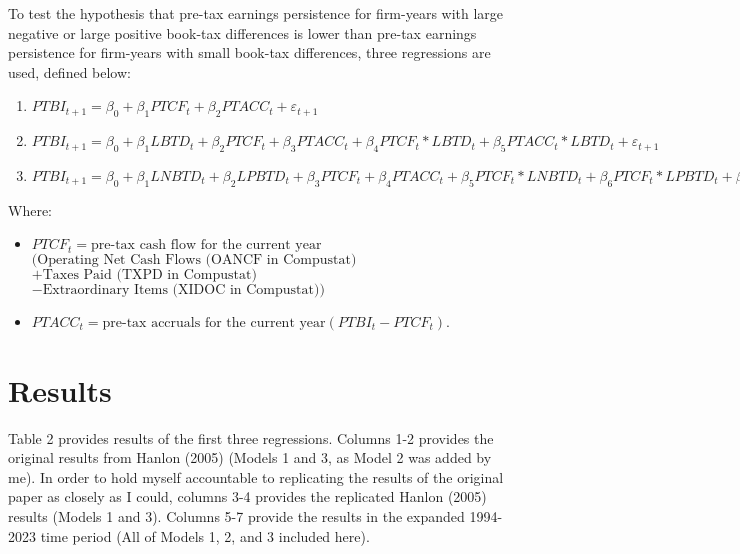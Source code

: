 \documentclass{article}
\begin{document}
To test the hypothesis that pre-tax earnings persistence for firm-years with large negative or large positive book-tax differences is lower than pre-tax earnings persistence for firm-years with small book-tax differences, three regressions are used, defined below:
\begin{enumerate}
    \item $PTBI_{t+1} = \beta_0 + \beta_1PTCF_t + \beta_2PTACC_t + \varepsilon_{t+1}$
    \item $PTBI_{t+1} = \beta_0 + \beta_1LBTD_t + \beta_2PTCF_t + \beta_3PTACC_t + \beta_4PTCF_t * LBTD_t + \beta_5PTACC_t * LBTD_t + \varepsilon_{t+1}$
    \item $PTBI_{t+1} = \beta_0 + \beta_1LNBTD_t + \beta_2LPBTD_t + \beta_3PTCF_t + \beta_4PTACC_t + \beta_5PTCF_t * LNBTD_t + \beta_6PTCF_t * LPBTD_t + \beta_7PTACC_t * LNBTD_t + \beta_8PTACC_t * LPBTD_t + \varepsilon_{t+1}$
\end{enumerate}
Where:
\begin{itemize}
   \item $PTCF_t = \text{pre-tax cash flow for the current year}$ \\
      $(\text{Operating Net Cash Flows (OANCF in Compustat)}$ \\
      $+ \text{Taxes Paid (TXPD in Compustat)}$ \\
      $- \text{Extraordinary Items (XIDOC in Compustat)})$

    \item $PTACC_t = \text{pre-tax accruals for the current year} (PTBI_t - PTCF_t)$.
\end{itemize}

\section{Results}
Table 2 provides results of the first three regressions. Columns 1-2 provides the original results from Hanlon (2005) (Models 1 and 3, as Model 2 was added by me). In order to hold myself accountable to replicating the results of the original paper as closely as I could, columns 3-4 provides the replicated Hanlon (2005) results (Models 1 and 3). Columns 5-7 provide the results in the expanded 1994-2023 time period (All of Models 1, 2, and 3 included here). 
\end{document}
